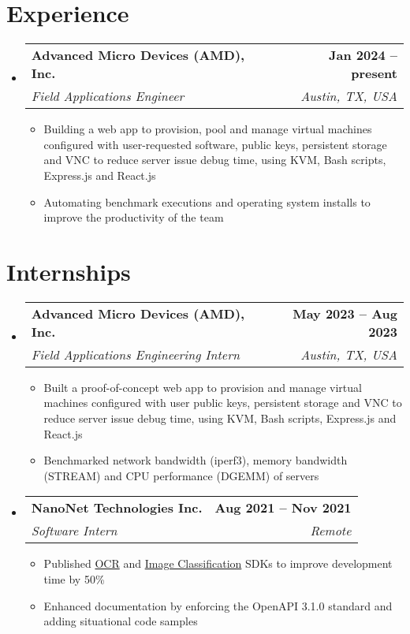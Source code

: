 \documentclass[letterpaper,11pt]{article}
\makeatletter
\newcommand{\resumeItem}[1]{
  \item\small{
    {#1 \vspace{-2pt}}
  }
}
\newcommand{\resumeSubheading}[4]{
  \vspace{-2pt}\item
    \begin{tabular*}{1.0\textwidth}[t]{l@{\extracolsep{\fill}}r}
      \vspace{-2pt}\textbf{#1} & \textbf{\small #2} \\
      \textit{\small#3} & \textit{\small #4} \\
    \end{tabular*}\vspace{-7pt}
}
\newcommand{\resumeSubHeadingListStart}{\begin{itemize}[leftmargin=0.0in, label={}]}
\newcommand{\resumeSubHeadingListEnd}{\end{itemize}}
\newcommand{\resumeItemListStart}{\begin{itemize}}
\newcommand{\resumeItemListEnd}{\end{itemize}\vspace{-5pt}}
\makeatother
\begin{document}
\section{Experience}
    \resumeSubHeadingListStart
        \resumeSubheading
            {Advanced Micro Devices (AMD), Inc.}{Jan 2024 -- present}
            {Field Applications Engineer}{Austin, TX, USA}
            \resumeItemListStart
                \resumeItem{Building a web app to provision, pool and manage virtual machines configured with user-requested software, public keys, persistent storage and VNC to reduce server issue debug time, using KVM, Bash scripts, Express.js and React.js}
                \resumeItem{Automating benchmark executions and operating system installs to improve the productivity of the team}
            \resumeItemListEnd
    \resumeSubHeadingListEnd
\vspace{-15pt}


\section{Internships}
    \resumeSubHeadingListStart
        \resumeSubheading
            {Advanced Micro Devices (AMD), Inc.}{May 2023 -- Aug 2023}
            {Field Applications Engineering Intern}{Austin, TX, USA}
            \resumeItemListStart
                \resumeItem{Built a proof-of-concept web app to provision and manage virtual machines configured with user public keys, persistent storage and VNC to reduce server issue debug time, using KVM, Bash scripts, Express.js and React.js}
                \resumeItem{Benchmarked network bandwidth (iperf3), memory bandwidth (STREAM) and CPU performance (DGEMM) of servers}
            \resumeItemListEnd

        \resumeSubheading
            {NanoNet Technologies Inc.}{Aug 2021 -- Nov 2021}
            {Software Intern}{Remote}
            \resumeItemListStart
                \resumeItem{Published \href{https://www.npmjs.com/package/@nanonets/optical-character-recognition}{OCR} and \href{https://www.npmjs.com/package/@nanonets/image-classification}{Image Classification} SDKs to improve development time by 50\%}
                \resumeItem{Enhanced documentation by enforcing the OpenAPI 3.1.0 standard and adding situational code samples}
            \resumeItemListEnd
    \resumeSubHeadingListEnd
\vspace{-15pt}
\end{document}

